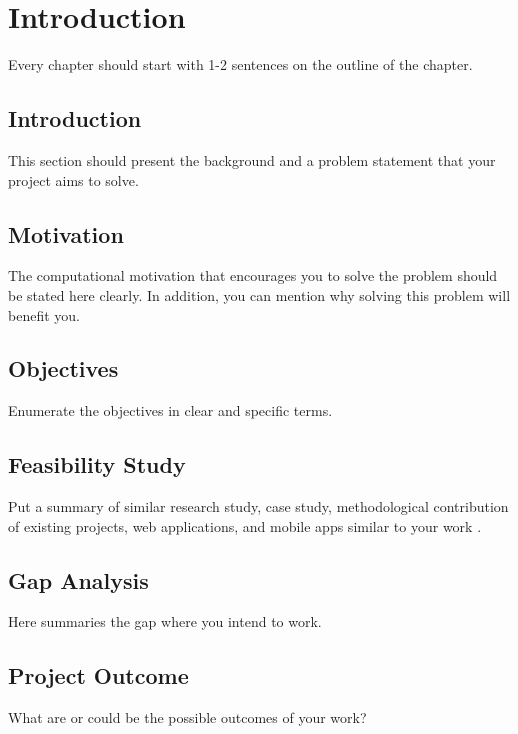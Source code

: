 \chapter{Introduction}

\begin{center}
\noindent Every chapter should start with 1-2 sentences on the outline of the chapter.
\end{center}


\begin{flushleft}
\section{Introduction}
This section should present the background and a problem statement that your project aims to solve.

\section{Motivation}
The computational motivation that encourages you to solve the problem should be stated here clearly. In addition, you can mention why solving this problem will benefit you.

\section{Objectives}
Enumerate the objectives in clear and specific terms.


\section{Feasibility Study}
Put a summary of similar research study, case study, methodological contribution of existing projects, web applications, and mobile apps similar to your work \cite{kleinberg2006algorithm}.

\section{Gap Analysis}
Here summaries the gap where you intend to work.

\section{Project Outcome}
What are or could be the possible outcomes of your work?
\end{flushleft}